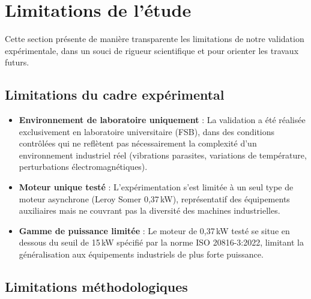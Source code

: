 
\section{Limitations de l'étude}

Cette section présente de manière transparente les limitations de notre validation expérimentale, dans un souci de rigueur scientifique et pour orienter les travaux futurs.

\subsection{Limitations du cadre expérimental}

\begin{itemize}
    \item \textbf{Environnement de laboratoire uniquement} : La validation a été réalisée exclusivement en laboratoire universitaire (FSB), dans des conditions contrôlées qui ne reflètent pas nécessairement la complexité d'un environnement industriel réel (vibrations parasites, variations de température, perturbations électromagnétiques).

    \item \textbf{Moteur unique testé} : L'expérimentation s'est limitée à un seul type de moteur asynchrone (Leroy Somer 0,37\,kW), représentatif des équipements auxiliaires mais ne couvrant pas la diversité des machines industrielles.

    \item \textbf{Gamme de puissance limitée} : Le moteur de 0,37\,kW testé se situe en dessous du seuil de 15\,kW spécifié par la norme ISO 20816-3:2022, limitant la généralisation aux équipements industriels de plus forte puissance.
\end{itemize}

\subsection{Limitations méthodologiques}

